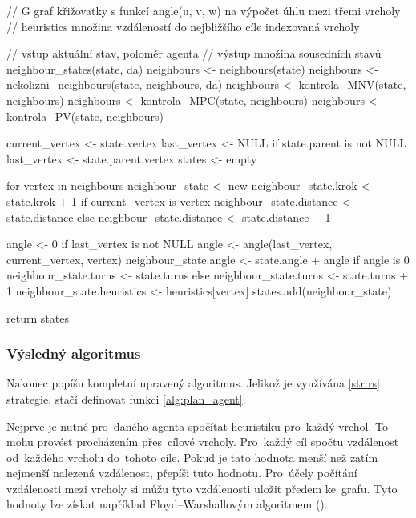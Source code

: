 \begin{code}[fontsize=\footnotesize]
// G graf křižovatky s funkcí angle(u, v, w) na výpočet úhlu mezi třemi vrcholy
// heuristics množina vzdáleností do nejbližšího cíle indexovaná vrcholy

// vstup aktuální stav, poloměr agenta
// výstup množina sousedních stavů
neighbour_states(state, da)
  neighbours <- neighbours(state)
  neighbours <- nekolizni_neighbours(state, neighbours, da)
  neighbours <- kontrola_MNV(state, neighbours)
  neighbours <- kontrola_MPC(state, neighbours)
  neighbours <- kontrola_PV(state, neighbours)

  current_vertex <- state.vertex
  last_vertex <- NULL
  if state.parent is not NULL
    last_vertex <- state.parent.vertex
  states <- empty

  for vertex in neighbours
    neighbour_state <- new
    neighbour_state.krok <- state.krok + 1
    if current_vertex is vertex
      neighbour_state.distance <- state.distance
    else
      neighbour_state.distance <- state.distance + 1

    angle <- 0
    if last_vertex is not NULL
      angle <- angle(last_vertex, current_vertex, vertex)
    neighbour_state.angle <- state.angle + angle
    if angle is 0
      neighbour_state.turns <- state.turns
    else
      neighbour_state.turns <- state.turns + 1
    neighbour_state.heuristics <- heuristics[vertex]
    states.add(neighbour_state)

  return states
\end{code}

\subsubsection{Výsledný algoritmus}\label{subsubsec:ars_vysledny_algoritmus}

Nakonec popíšu kompletní upravený  algoritmus.
Jelikož je využívána \ref{str:rs} strategie, stačí definovat funkci \ref{alg:plan_agent}.

Nejprve je nutné pro~daného agenta spočítat heuristiku pro~každý vrchol.
To mohu provést procházením přes~cílové vrcholy.
Pro~každý cíl spočtu vzdálenost od~každého vrcholu do~tohoto cíle.
Pokud je tato hodnota menší než zatím nejmenší nalezená vzdálenost, přepíši tuto hodnotu.
Pro~účely počítání vzdálenosti mezi vrcholy si můžu tyto vzdálenosti uložit předem ke~grafu.
Tyto hodnoty lze získat například Floyd–Warshallovým algoritmem (\citet*{Floyd-Warshall}).

